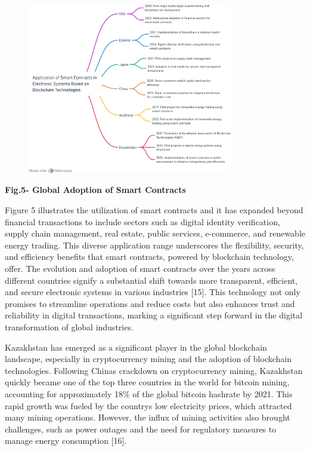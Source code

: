 \begin{figure}[H]
	\centering
	\includegraphics[width=0.8\textwidth]{assets/82}
	\caption*{}
\end{figure}

\textbf{Fig.5- Global Adoption of Smart Contracts}

Figure 5 illustrates the utilization of smart contracts and it has
expanded beyond financial transactions to include sectors such as
digital identity verification, supply chain management, real estate,
public services, e-commerce, and renewable energy trading. This diverse
application range underscores the flexibility, security, and efficiency
benefits that smart contracts, powered by blockchain technology, offer.
The evolution and adoption of smart contracts over the years across
different countries signify a substantial shift towards more
transparent, efficient, and secure electronic systems in various
industries {[}15{]}. This technology not only promises to streamline
operations and reduce costs but also enhances trust and reliability in
digital transactions, marking a significant step forward in the digital
transformation of global industries.

Kazakhstan has emerged as a significant player in the global blockchain
landscape, especially in cryptocurrency mining and the adoption of
blockchain technologies. Following China\textquotesingle s crackdown on
cryptocurrency mining, Kazakhstan quickly became one of the top three
countries in the world for bitcoin mining, accounting for approximately
18\% of the global bitcoin hashrate by 2021. This rapid growth was
fueled by the country\textquotesingle s low electricity prices, which
attracted many mining operations. However, the influx of mining
activities also brought challenges, such as power outages and the need
for regulatory measures to manage energy consumption {[}16{]}.


